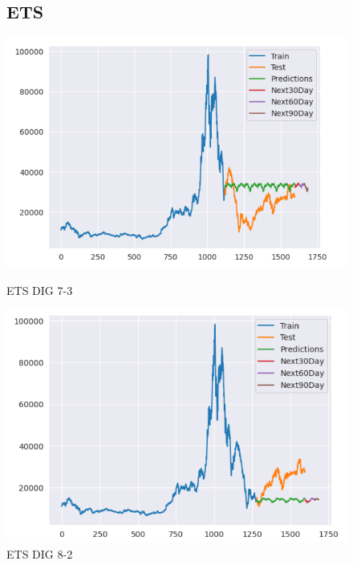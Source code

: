 \documentclass[conference]{IEEEtran}
\begin{document}
\begin{enumerate}
\begin{figure}[htbp]
\subsection{ETS}
\centering
    \begin{minipage}{0.23\textwidth}
    \centering
    \includegraphics[width=1\textwidth]{experiment/ets/TEAM4_ETS_DIG_7_3.png}
    \caption{ETS DIG 7-3}
    \label{fig:nvl_boxplot}
    \end{minipage}
    \hfill
    \begin{minipage}{0.23\textwidth}
    \centering
    \includegraphics[width=1\textwidth]{experiment/ets/TEAM4_ETS_DIG_8_2.png}
    \caption{ETS DIG 8-2}
    \label{fig:nvl_histogram}
    \end{minipage}
    \begin{minipage}{0.23\textwidth}
    \centering

\end{minipage}
\end{figure}
\end{enumerate}
\end{document}
